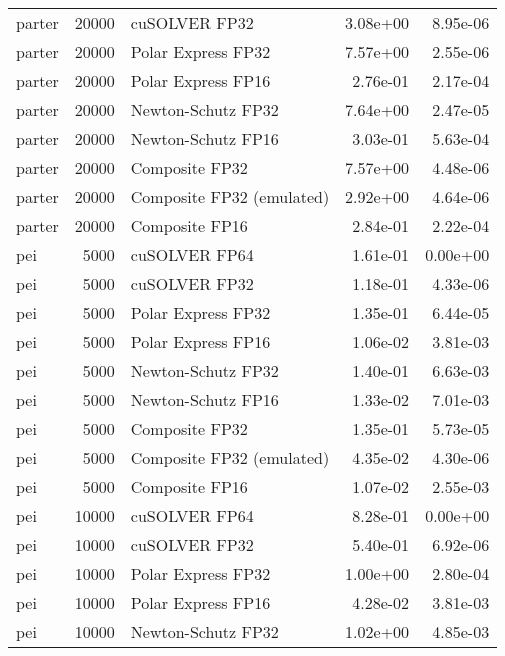 \begin{table}
\begin{tabular}{lrlrr}
   parter & 20000 &             cuSOLVER FP32 &  3.08e+00 &        8.95e-06 \\
   parter & 20000 &        Polar Express FP32 &  7.57e+00 &        2.55e-06 \\
   parter & 20000 &        Polar Express FP16 &  2.76e-01 &        2.17e-04 \\
   parter & 20000 &        Newton-Schutz FP32 &  7.64e+00 &        2.47e-05 \\
   parter & 20000 &        Newton-Schutz FP16 &  3.03e-01 &        5.63e-04 \\
   parter & 20000 &            Composite FP32 &  7.57e+00 &        4.48e-06 \\
   parter & 20000 & Composite FP32 (emulated) &  2.92e+00 &        4.64e-06 \\
   parter & 20000 &            Composite FP16 &  2.84e-01 &        2.22e-04 \\
      pei &  5000 &             cuSOLVER FP64 &  1.61e-01 &        0.00e+00 \\
      pei &  5000 &             cuSOLVER FP32 &  1.18e-01 &        4.33e-06 \\
      pei &  5000 &        Polar Express FP32 &  1.35e-01 &        6.44e-05 \\
      pei &  5000 &        Polar Express FP16 &  1.06e-02 &        3.81e-03 \\
      pei &  5000 &        Newton-Schutz FP32 &  1.40e-01 &        6.63e-03 \\
      pei &  5000 &        Newton-Schutz FP16 &  1.33e-02 &        7.01e-03 \\
      pei &  5000 &            Composite FP32 &  1.35e-01 &        5.73e-05 \\
      pei &  5000 & Composite FP32 (emulated) &  4.35e-02 &        4.30e-06 \\
      pei &  5000 &            Composite FP16 &  1.07e-02 &        2.55e-03 \\
      pei & 10000 &             cuSOLVER FP64 &  8.28e-01 &        0.00e+00 \\
      pei & 10000 &             cuSOLVER FP32 &  5.40e-01 &        6.92e-06 \\
      pei & 10000 &        Polar Express FP32 &  1.00e+00 &        2.80e-04 \\
      pei & 10000 &        Polar Express FP16 &  4.28e-02 &        3.81e-03 \\
      pei & 10000 &        Newton-Schutz FP32 &  1.02e+00 &        4.85e-03 \\

\end{tabular}
\end{table}
